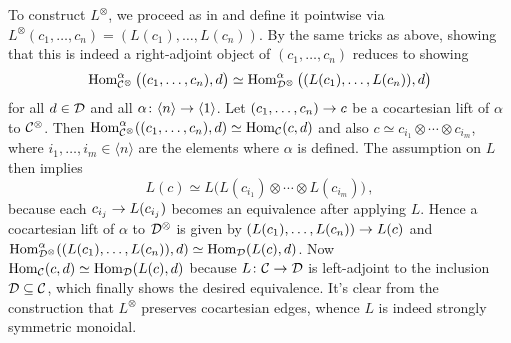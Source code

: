 \begin{proof*}
	To construct $L^\otimes$, we proceed as in  and define it pointwise via $L^\otimes(c_1,\dotsc,c_n)=(L(c_1),\dotsc,L(c_n))$. By the same tricks as above, showing that this is indeed a right-adjoint object of $(c_1,\dotsc,c_n)$ reduces to showing
	\begin{equation*}
		\operatorname{Hom}_{\mathcal{C}^\otimes}^\alpha\big((c_1,\dotsc,c_n),d\big)\simeq \operatorname{Hom}_{\mathcal{D}^\otimes}^\alpha\big((L(c_1),\dotsc,L(c_n)),d\big)
	\end{equation*}
	for all $d\in \mathcal{D}$ and all $\alpha\colon \langle n\rangle \morphism\langle 1\rangle$. Let $(c_1,\dotsc,c_n)\morphism c$ be a cocartesian lift of $\alpha$ to $\mathcal{C}^\otimes$. Then $\operatorname{Hom}_{\mathcal{C}^\otimes}^\alpha((c_1,\dotsc,c_n),d)\simeq\operatorname{Hom}_{\mathcal{C}}(c,d)$ and also $c\simeq c_{i_1}\otimes\dotsb\otimes c_{i_m}$, where $i_1,\dotsc,i_m\in\langle n\rangle$ are the elements where $\alpha$ is defined. The assumption on $L$ then implies
	\begin{equation*}
		L(c)\simeq L\big(L(c_{i_1})\otimes\dotsb\otimes L(c_{i_m})\big)\,,
	\end{equation*}
	because each $c_{i_j}\morphism L(c_{i_j})$ becomes an equivalence after applying $L$. Hence a cocartesian lift of $\alpha$ to $\mathcal{D}^\otimes$ is given by $(L(c_1),\dotsc,L(c_n))\morphism L(c)$ and $\operatorname{Hom}_{\mathcal{D}^\otimes}^\alpha((L(c_1),\dotsc,L(c_n)),d)\simeq \operatorname{Hom}_{\mathcal{D}}(L(c),d)$. Now $\operatorname{Hom}_{\mathcal{C}}(c,d)\simeq \operatorname{Hom}_{\mathcal{D}}(L(c),d)$ because $L\colon \Cc\morphism\Dd$ is left-adjoint to the inclusion $\mathcal{D}\subseteq\mathcal{C}$, which finally shows the desired equivalence. It's clear from the construction that $L^\otimes$ preserves cocartesian edges, whence $L$ is indeed strongly symmetric monoidal.
\end{proof*}
